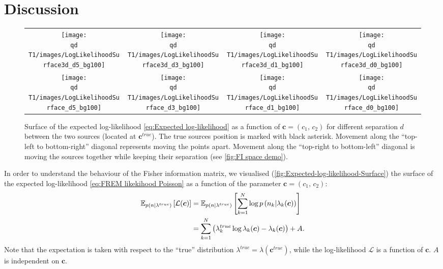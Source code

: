 \clearpage
\section{Discussion\label{sec:FREM discussion}}
\begin{figure}[thb]
	\centering
	\newcommand{\sizeff}{.18}
	\newcommand{\sizegg}{.16}	
	\begin{tabular}{cccc}
		\subfloat[$d=5$]{\texttt{[image: \\qd T1/images/LogLikelihoodSurface3d\_d5\_bg100]}} 
		
		& \subfloat[$d=3$]{\texttt{[image: \\qd T1/images/LogLikelihoodSurface3d\_d3\_bg100]}}
		
		& \subfloat[$d=1$]{\texttt{[image: \\qd T1/images/LogLikelihoodSurface3d\_d1\_bg100]}}
		
		& \subfloat[$d=0$]{\texttt{[image: \\qd T1/images/LogLikelihoodSurface3d\_d0\_bg100]}}
		
		\tabularnewline
		\subfloat[$d=5$]{\texttt{[image: \\qd T1/images/LogLikelihoodSurface\_d5\_bg100]}}
		
		& \subfloat[$d=3$]{\texttt{[image: \\qd T1/images/LogLikelihoodSurface\_d3\_bg100]}}
		
		& \subfloat[$d=1$]{\texttt{[image: \\qd T1/images/LogLikelihoodSurface\_d1\_bg100]}}
		
		& \subfloat[$d=0$]{\texttt{[image: \\qd T1/images/LogLikelihoodSurface\_d0\_bg100]}}
		
		\tabularnewline
	\end{tabular}
	\caption{Surface of the expected log-likelihood \autoref{eq:Expected log-likelihood} as a function of $\bm{c}=(c_1,\, c_2)$ for different separation $d$ between the two sources (located at $\bm{c}^{true}$). The true sources position is marked with black asterisk. Movement along the ``top-left to bottom-right'' diagonal represents moving the points apart. Movement along the ``top-right to bottom-left'' diagonal is moving the sources together while keeping their separation (see \autoref{fig:FI space demo}).}	
	\label{fig:Expected-log-likelihood-Surface}
\end{figure}

In order to understand the behaviour of the Fisher information matrix, we visualised (\autoref{fig:Expected-log-likelihood-Surface}) the surface of the expected log-likelihood \autoref{eq:FREM likekihood Poisson} as a function of the parameter $\bm{c}=(c_1,\, c_2)$: 
%
\begin{alignat}{2}
	\mathbb{E}_{p(n|\lambda^{true})}\left[\mathcal{L}(\bm{c})\right]&=\mathbb{E}_{p(n|\lambda^{true})}\left[\sum_{k=1}^N\log p\left(n_k|\lambda_k(\bm{c})\right)\right]\nonumber\\
	&=\sum_{k=1}^N\left(\lambda_k^{true}\log\lambda_k(\bm{c})-\lambda_k(\bm{c})\right)+A.
	\label{eq:Expected log-likelihood}
\end{alignat}
%
Note that the expectation is taken with respect to the ``true'' distribution $\lambda^{true}=\lambda(\bm{c}^{true})$, while the log-likelihood $\mathcal{L}$ is a function of $\bm{c}$. $A$ is independent on $\bm{c}$. 

